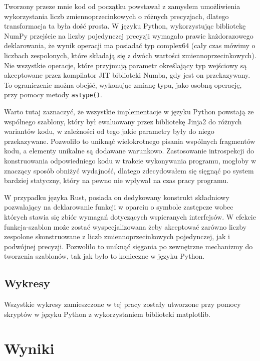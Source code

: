 \documentclass[11pt, a4paper]{article}
\newcommand{\code}[1]{\texttt{#1}}
\begin{document}
\begin{sloppypar}
    Tworzony przeze mnie kod od początku powstawał z zamysłem umożliwienia wykorzystania
    liczb zmiennoprzecinkowych o różnych precyzjach, dlatego transformacja ta była dość prosta.
    W języku Python, wykorzystując bibliotekę NumPy przejście na liczby pojedynczej precyzji
    wymagało prawie każdorazowego deklarowania, że wynik operacji ma posiadać typ
    complex64 (cały czas mówimy o liczbach zespolonych, które składają się z dwóch
    wartości zmiennoprzecinkowych). Nie wszystkie operacje, które przyjmują parametr określający
    typ wejściowy są akceptowane przez kompilator JIT biblioteki Numba, gdy jest on
    przekazywany. To ograniczenie można obejść, wykonując zmianę typu, jako osobną operację,
    przy pomocy metody \code{astype()}.

    Warto tutaj zaznaczyć, że wszystkie implementacje w języku Python powstają ze
    wspólnego szablony, który był ewaluowany przez bibliotekę Jinja2 do różnych wariantów
    kodu, w zależności od tego jakie parametry były do niego przekazywane. Pozwoliło to uniknąć
    wielokrotnego pisania wspólnych fragmentów kodu, a elementy unikalne są dodawane
    warunkowo. Zastosowanie introspekcji do konstruowania odpowiedniego kodu w trakcie wykonywania
    programu, mogłoby w znaczący sposób obniżyć wydajność, dlatego zdecydowałem się sięgnąć
    po system bardziej statyczny, który na pewno nie wpływał na czas pracy programu.

    W przypadku języka Rust, posiada on dedykowany konstrukt składniowy pozwalający na deklarowanie
    funkcji w oparciu o symbole zastępcze wobec których stawia się zbiór wymagań dotyczących
    wspieranych interfejsów. W efekcie funkcja-szablon może zostać wyspecjalizowana żeby
    akceptować zarówno liczby zespolone skonstruowane z liczb zmiennoprzecinkowych
    pojedynczej, jak i podwójnej precyzji. Pozwoliło to uniknąć sięgania po zewnętrzne
    mechanizmy do tworzenia szablonów, tak jak było to konieczne w języku Python.

    \subsection{Wykresy}
    Wszystkie wykresy zamieszczone w tej pracy zostały utworzone przy pomocy skryptów w języku
    Python z wykorzystaniem biblioteki matplotlib\cite{Hunter:2007}.

    \section{Wyniki}
    \FloatBarrier

\end{sloppypar}
\end{document}
